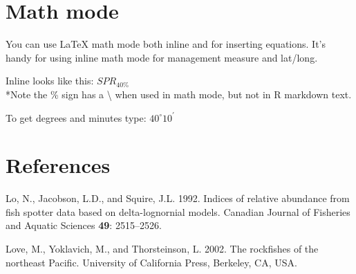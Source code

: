 \documentclass[12pt,]{article}
\begin{document}
\section{Math mode}\label{math-mode}

You can use LaTeX math mode both inline and for inserting equations.
It's handy for using inline math mode for management measure and
lat/long.

Inline looks like this: \(SPR_{40\%}\)\\
*Note the \% sign has a \textbackslash{} when used in math mode, but not
in R markdown text.

To get degrees and minutes type: \(40^\circ 10^\prime\)

\section*{References}\label{references}

\hypertarget{refs}{}
\hypertarget{ref-Lo1992}{}
Lo, N., Jacobson, L.D., and Squire, J.L. 1992. Indices of relative
abundance from fish spotter data based on delta-lognornial models.
Canadian Journal of Fisheries and Aquatic Sciences \textbf{49}:
2515--2526.

\hypertarget{ref-Love2002}{}
Love, M., Yoklavich, M., and Thorsteinson, L. 2002. The rockfishes of
the northeast Pacific. University of California Press, Berkeley, CA,
USA.
\end{document}
